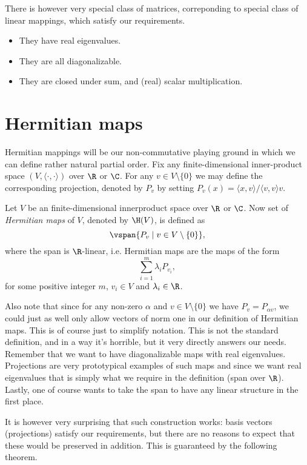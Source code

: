 There is however very special class of matrices, correponding to special class of linear mappings, which satisfy our requirements.
\begin{itemize}
	\item They have real eigenvalues.
	\item They are all diagonalizable.
	\item They are closed under sum, and (real) scalar multiplication.
\end{itemize}

\section{Hermitian maps}

Hermitian mappings will be our non-commutative playing ground in which we can define rather natural partial order. Fix any finite-dimensional inner-product space $(V, \langle \cdot, \cdot \rangle )$ over $\R$ or $\C$. For any $v \in V \setminus \{0\}$ we may define the corresponding projection, denoted by $P_{v}$ by setting $P_{v}(x) = \langle x , v \rangle /\langle v, v \rangle v$.

\begin{maar}
	Let $V$ be an finite-dimensional innerproduct space over $\R$ or $\C$. Now set of \textit{Hermitian maps} of $V$, denoted by $\H(V)$, is defined as
	\[
		\vspan \{P_{v} \mid v \in V \setminus \{0\}\},
	\]
	where the span is $\R$-linear, i.e. Hermitian maps are the maps of the form
	\[
		\sum_{i = 1}^{m} \lambda_{i} P_{v_{i}},
	\]
	for some positive integer $m$, $v_{i} \in V$ and $\lambda_{i} \in \R$.
\end{maar}

Also note that since for any non-zero $\alpha$ and $v \in V \setminus \{0\}$ we have $P_{v} = P_{\alpha v}$, we could just as well only allow vectors of norm one in our definition of Hermitian maps. This is of course just to simplify notation. This is not the standard definition, and in a way it's horrible, but it very directly answers our needs. Remember that we want to have diagonalizable maps with real eigenvalues. Projections are very prototypical examples of such maps and since we want real eigenvalues that is simply what we require in the definition (span over $\R$). Lastly, one of course wants to take the span to have any linear structure in the first place.

It is however very surprising that such construction works: basis vectors (projections) satisfy our requirements, but there are no reasons to expect that these would be preserved in addition. This is guaranteed by the following theorem.

